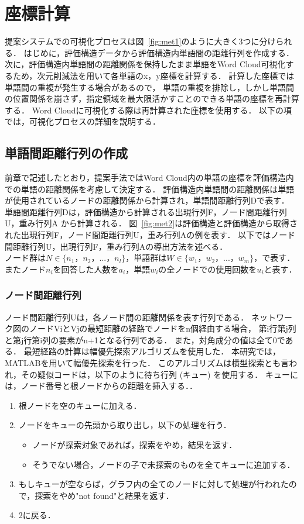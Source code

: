 \documentclass[syuuron]{kuee}
\begin{document}
	\section{座標計算}
		提案システムでの可視化プロセスは図~\ref{fig:met1}のように大きく3つに分けられる．
		はじめに，評価構造データから評価構造内単語間の距離行列を作成する．
		次に，評価構造内単語間の距離関係を保持したまま単語をWord Cloud可視化するため，次元削減法を用いて各単語のx，y座標を計算する．
		計算した座標では単語間の重複が発生する場合があるので，
		単語の重複を排除し，しかし単語間の位置関係を崩さず，指定領域を最大限活かすことのできる単語の座標を再計算する．
		Word Cloudに可視化する際は再計算された座標を使用する．
		以下の項では，可視化プロセスの詳細を説明する．
		
		\subsection{単語間距離行列の作成}
			前章で記述したとおり，提案手法ではWord Cloud内の単語の座標を評価構造内での単語の距離関係を考慮して決定する．
			評価構造内単語間の距離関係は単語が使用されているノードの距離関係から計算され，単語間距離行列Dで表す．
			単語間距離行列Dは，評価構造から計算される出現行列F，ノード間距離行列U，重み行列A から計算される．
			図~\ref{fig:met2}は評価構造と評価構造から取得された出現行列F，ノード間距離行列U，重み行列Aの例を表す．
			以下ではノード間距離行列U，出現行列F，重み行列Aの導出方法を述べる．
			$ノード群はN \in \bigl\{n_{1}，n_{2}，...，n_{l} \bigl\}，単語群はW \in \bigl\{w_{1}，w_{2}，...，w_{m} \bigl\}，で表す．$
			$またノードn_iを回答した人数をa_i，単語w_iの全ノードでの使用回数をu_iと表す．$
			
			\subsubsection{ノード間距離行列}
				ノード間距離行列Uは，各ノード間の距離関係を表す行列である．
				ネットワーク図のノードViとVjの最短距離の経路でノードをn個経由する場合，
				第i行第j列と第j行第i列の要素がn+1となる行列である．
				また，対角成分の値は全て0である．
				最短経路の計算は幅優先探索アルゴリズムを使用した．
				本研究では，MATLABを用いて幅優先探索を行った\cite{int1}．
				このアルゴリズムは横型探索とも言われ，その疑似コードは，以下のように待ち行列 (キュー) を使用する．
				キューには，ノード番号と根ノードからの距離を挿入する．．
				
				\begin{enumerate}
					\item 根ノードを空のキューに加える．
					\item ノードをキューの先頭から取り出し，以下の処理を行う．
						\begin{itemize}
							\item ノードが探索対象であれば，探索をやめ，結果を返す．
							\item そうでない場合，ノードの子で未探索のものを全てキューに追加する．
						\end{itemize}
					\item もしキューが空ならば，グラフ内の全てのノードに対して処理が行われたので，探索をやめ"not found"と結果を返す．
					\item 2に戻る．
				\end{enumerate}
				
\end{document}
